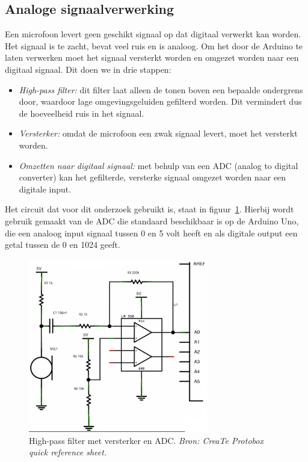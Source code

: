 \documentclass[a4paper,10pt]{article}
\begin{document}
\subsection{Analoge signaalverwerking}
Een microfoon levert geen geschikt signaal op dat digitaal verwerkt kan worden. Het signaal is te zacht, bevat veel ruis en is analoog. Om het door de Arduino te laten verwerken moet het signaal versterkt worden en omgezet worden naar een digitaal signaal. Dit doen we in drie stappen:
\begin{itemize}
    \item \textit{High-pass filter:} dit filter laat alleen de tonen boven een bepaalde ondergrens door, waardoor lage omgevingsgeluiden gefilterd worden. Dit vermindert dus de hoeveelheid ruis in het signaal.
    \item \textit{Versterker:} omdat de microfoon een zwak signaal levert, moet het versterkt worden.
    \item \textit{Omzetten naar digitaal signaal:} met behulp van een ADC (analog to digital converter) kan het gefilterde, versterke signaal omgezet worden naar een digitale input.
\end{itemize}

Het circuit dat voor dit onderzoek gebruikt is, staat in figuur~\ref{fig:circuit}. Hierbij wordt gebruik gemaakt van de ADC die standaard beschikbaar is op de Arduino Uno, die een analoog input signaal tussen 0 en 5 volt heeft en als digitale output een getal tussen de 0 en 1024 geeft.

\begin{figure}[ht!]
    \centering
    \includegraphics[width=0.7\textwidth]{high_pass_filter_circuit.png}
    \caption{High-pass filter met versterker en ADC. \textit{Bron: CreaTe Protobox quick reference sheet.}}
    \label{fig:circuit}
\end{figure}
\FloatBarrier
\end{document}
